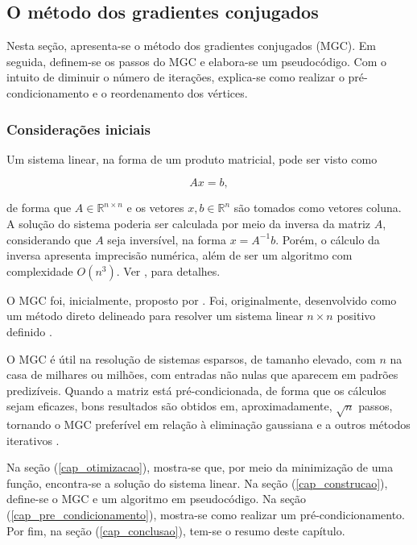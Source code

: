 \subsection{O método dos gradientes conjugados}
\label{cap_metodo_gradientes_conjugados}

Nesta seção, apresenta-se o método dos gradientes conjugados (MGC). Em seguida, definem-se os passos do MGC e elabora-se um pseudocódigo. Com o intuito de diminuir o número de iterações, explica-se como realizar o pré-condicionamento e o reordenamento dos vértices.  

\subsubsection{Considerações iniciais}

Um sistema linear, na forma de um produto matricial, pode ser visto como 

\begin{equation}
Ax = b,
\label{equacao_ax=b}
\end{equation}

\noindent de forma que ${A \in \mathbb{R}^{n \times n}}$ e os vetores $x , b \in \mathbb{R}^{n}$ são tomados como vetores coluna. A solução do sistema poderia ser calculada por meio da inversa da matriz $A$, considerando que $A$ seja inversível, na forma $x = A^{-1}b$. Porém, o cálculo da inversa apresenta imprecisão numérica, além de ser um algoritmo com complexidade $O(n^3)$. Ver , para detalhes.

O MGC foi, inicialmente, proposto por . Foi, originalmente, desenvolvido como um método direto delineado para resolver um sistema linear $n \times n$ positivo definido  \cite [p.~479]{Burden2010}.

O MGC é útil na resolução de sistemas esparsos, de tamanho elevado, com $n$ na casa de milhares ou milhões, com entradas não nulas que aparecem em padrões predizíveis. Quando a matriz está pré-condicionada, de forma que os cálculos sejam eficazes, bons resultados são obtidos em, aproximadamente, $\sqrt{n}$ passos, tornando o MGC preferível em relação à eliminação gaussiana e a outros métodos iterativos  \cite[p.~479]{Burden2010}.

Na seção (\ref{cap_otimizacao}), mostra-se que, por meio da minimização de uma função, encontra-se a solução do sistema linear. Na seção (\ref{cap_construcao}), define-se o MGC e um algoritmo em pseudocódigo. Na seção (\ref{cap_pre_condicionamento}), mostra-se como realizar um pré-condicionamento.
Por fim, na seção (\ref{cap_conclusao}), tem-se o resumo deste capítulo.

